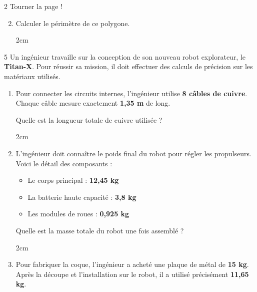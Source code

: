\documentclass[a4paper]{book}
\begin{document}
{\begin{exerciceNote}{2}
\vfill
\hfill Tourner la page !

\newpage

        \begin{enumerate}
            \setcounter{enumi}{1}
            \item Calculer le périmètre de ce polygone.

            \begin{ZoneReponse}{2cm}               
            \end{ZoneReponse}
        \end{enumerate}
    \end{exerciceNote}


    \begin{exerciceNote}{5}
        Un ingénieur travaille sur la conception de son nouveau robot explorateur, le \textbf{Titan-X}. Pour réussir sa mission, il doit effectuer des calculs de précision sur les matériaux utilisés.

        \begin{enumerate}[leftmargin=*]
            \item Pour connecter les circuits internes, l'ingénieur utilise \textbf{8 câbles de cuivre}. Chaque câble mesure exactement \textbf{1,35 m} de long.

            Quelle est la longueur totale de cuivre utilisée ?

            \begin{ZoneReponse}{2cm}
            \end{ZoneReponse}

            \item L'ingénieur doit connaître le poids final du robot pour régler les propulseurs. Voici le détail des composants :
            \begin{itemize}
                \item Le corps principal : \textbf{12,45 kg}
                \item La batterie haute capacité : \textbf{3,8 kg}
                \item Les modules de roues : \textbf{0,925 kg}
            \end{itemize}

            Quelle est la masse totale du robot une fois assemblé ?

            \begin{ZoneReponse}{2cm}
            \end{ZoneReponse}

            \item Pour fabriquer la coque, l'ingénieur a acheté une plaque de métal de \textbf{15 kg}. Après la découpe et l'installation sur le robot, il a utilisé précisément \textbf{11,65 kg}.
            

\end{enumerate}
\end{exerciceNote}}
\end{document}
